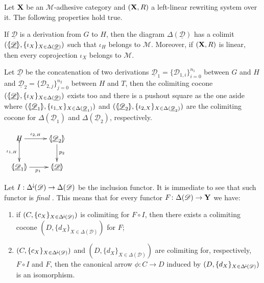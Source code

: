 \documentclass[a4paper,UKenglish,cleveref,pdftex,thm-restate,numberwithinsect]{lipics-v2021}
\newcommand{\Deltamin}{\Delta^{\hspace{-1pt}\downarrow\hspace{-1pt}}}
\def\R{\mathsf{R}}
\def\X{\textbf {\textup{X}}}
\def\Y{\textbf {\textup{Y}}}
\newcommand{\dder}[1]{\mathscr{#1}}
\newcommand{\der}[1]{\underline{\dder{#1}}}
\newcommand{\lpro}{\langle \hspace{-1.85pt}[}
\newcommand{\rpro}{]\hspace{-1.85pt}\rangle}
\newcommand{\tpro}[1]{\lpro \der{#1}\rpro}
\newcommand{\tproi}[2]{\lpro \der{#1}_{#2}\rpro}
\begin{document}
\begin{lemma}\label{lem:colim}
	Let $\X$ be an $\mathcal{M}$-adhesive category and $(\X, \R)$ a
	left-linear rewriting system over it. The following properties
	hold true.
	\begin{enumerate}
		\item  If $\der{D}$ is a derivation from $G$ to $H$, then the diagram $\Delta(\der{D})$ has a colimit $(\tpro{D}, \{\iota_X\}_{X\in \Delta(\der{D})})$ such that $\iota_H$ belongs to $\mathcal{M}$. Moreover, if $(\X, \R)$ is linear, then every coprojection $\iota_X$ belongs to $\mathcal{M}$.
		
		\parbox{10cm}{
		\item Let $\der{D}$ be the concatenation of two derivations $\der{D}_1=\{\dder{D}_{1,i}\}_{i=0}^{n_1}$ between $G$ and $H$ and $\der{D}_2=\{\dder{D}_{2,j}\}_{j=0}^{n_2}$ between $H$ and $T$,  then the colimiting cocone $(\tpro{D}, \{\iota_X\}_{X\in \Delta(\der{D})})$ exists too and there is a pushout square as the one aside
		where $(\tproi{D}{1}, \{\iota_{1, X}\}_{X\in \Delta(\der{D}_1)})$ and $(\tproi{D}{2}, \{\iota_{2, X}\}_{X\in \Delta(\der{D}_2)})$ are the colimiting cocone for $\Delta(\der{D}_1)$ and $\Delta(\der{D}_2)$, respectively.} 
		\parbox{3cm}{\vspace{-.5cm}
		$\xymatrix{H\ar[r]^-{\iota_{2, H}} \ar@{>->}[d]_-{\iota_{1, H}} & \tproi{D}{2} \ar[d]^{p_2}\\  \tproi{D}{1} \ar[r]_{p_1}& \tpro{D}}$}
	\end{enumerate}
\end{lemma}
\begin{remark}\label{rem:cof}
	Let $I:\Deltamin(\dder{D})\to \Delta(\dder{D})$ be the inclusion functor. It is immediate to see that such functor is \emph{final} \cite{mac2013categories}. This means that for every functor $F\colon \Delta(\dder{D})\to \Y$ we have:
	\begin{enumerate}
		\item if  $(C, \{c_X\}_{X\in \Deltamin(\dder{D})})$ is colimiting for $F\circ I$, then there exists a colimiting cocone $(D, \{d_X\}_{X\in \Delta(\dder{D})})$ for $F$;
		\item $(C, \{c_X\}_{X\in \Deltamin(\dder{D})})$ and $(D, \{d_X\}_{X\in \Delta(\dder{D})})$ are colimiting for, respectively, $F\circ I$ and $F$, then the canonical arrow $\phi\colon C\to D$ induced by $(D, \{d_X\}_{X\in \Deltamin(\dder{D})})$ is an isomorphism.
	\end{enumerate}
\end{remark}
\end{document}
